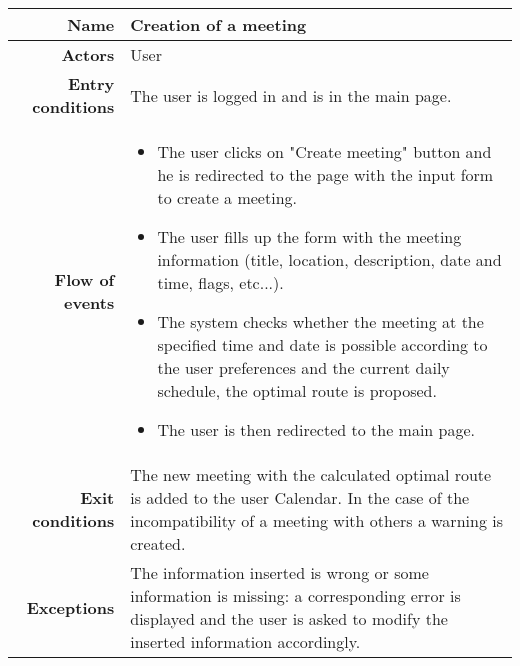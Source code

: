 \begin{center}
\begin{tabular}{r|p{7cm}}
\bf\large Name&\bf\large Creation of a meeting\\
\hline
\hline
\bf Actors&User\\
\hline
\bf Entry conditions&The user is logged in and is in the main page.\\
\hline
\bf Flow of events&
\begin{itemize}

\item The user clicks on "Create meeting" button and he is redirected to the page with the input form to create a meeting.

\item The user fills up the form with the meeting information (title, location, description, date and time, flags, etc...).

\item The system checks whether the meeting at the specified time and date is possible according to the user preferences and the current daily schedule, the optimal route is proposed.


\item The user is then redirected to the main page.

\end{itemize}
\\
\hline
\bf Exit conditions&The new meeting with the calculated optimal route is added to the user Calendar. In the case of the incompatibility of a meeting with others a warning is created.\\
\hline
\bf Exceptions&The information inserted is wrong or some information is missing: a corresponding error is displayed and the user is asked to modify the inserted information accordingly.
\\
\hline

\end{tabular}
\end{center}